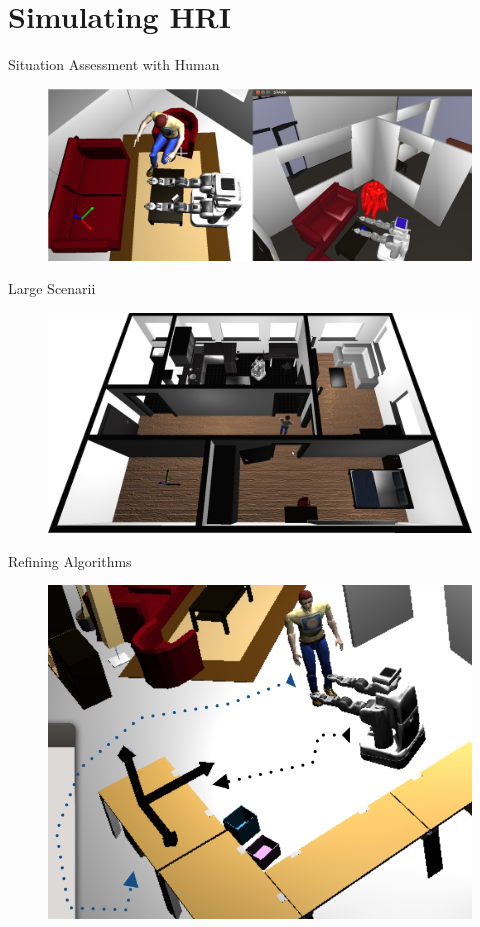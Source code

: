 \documentclass[compress]{beamer}
\begin{document}

\section{Simulating HRI}

\begin{frame}{Situation Assessment with Human}
    \begin{figure}
        \centering
        \includegraphics[width=\linewidth]{morsespark}
    \end{figure}

\end{frame}

\begin{frame}{Large Scenarii}
    \begin{figure}
        \centering
        \includegraphics[width=\linewidth]{morse_apartment}
    \end{figure}

\end{frame}

\begin{frame}{Refining Algorithms}
    \begin{figure}
        \centering
        \includegraphics[width=0.8\linewidth]{proto-setup}
    \end{figure}

\end{frame}
\end{document}
